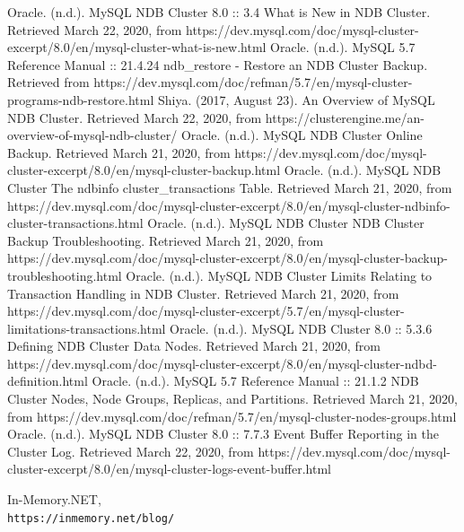\documentclass{acmart}
\begin{document}
\begin{thebibliography}{99}
     Oracle. (n.d.). MySQL NDB Cluster 8.0 :: 3.4 What is New in NDB Cluster. Retrieved March 22, 2020, from https://dev.mysql.com/doc/mysql-cluster-excerpt/8.0/en/mysql-cluster-what-is-new.html
     Oracle. (n.d.). MySQL 5.7 Reference Manual :: 21.4.24 ndb\_restore - Restore an NDB Cluster Backup. Retrieved from https://dev.mysql.com/doc/refman/5.7/en/mysql-cluster-programs-ndb-restore.html
      Shiya. (2017, August 23). An Overview of MySQL NDB Cluster. Retrieved March 22, 2020, from https://clusterengine.me/an-overview-of-mysql-ndb-cluster/ 
	 Oracle. (n.d.). MySQL NDB Cluster Online Backup. Retrieved March 21, 2020, from https://dev.mysql.com/doc/mysql-cluster-excerpt/8.0/en/mysql-cluster-backup.html
	 Oracle. (n.d.). MySQL NDB Cluster The ndbinfo cluster\_transactions Table. Retrieved March 21, 2020, from https://dev.mysql.com/doc/mysql-cluster-excerpt/8.0/en/mysql-cluster-ndbinfo-cluster-transactions.html
	 Oracle. (n.d.). MySQL NDB Cluster NDB Cluster Backup Troubleshooting. Retrieved March 21, 2020, from https://dev.mysql.com/doc/mysql-cluster-excerpt/8.0/en/mysql-cluster-backup-troubleshooting.html
	 Oracle. (n.d.). MySQL NDB Cluster Limits Relating to Transaction Handling in NDB Cluster. Retrieved March 21, 2020, from https://dev.mysql.com/doc/mysql-cluster-excerpt/5.7/en/mysql-cluster-limitations-transactions.html
	 Oracle. (n.d.). MySQL NDB Cluster 8.0 :: 5.3.6 Defining NDB Cluster Data Nodes. Retrieved March 21, 2020, from https://dev.mysql.com/doc/mysql-cluster-excerpt/8.0/en/mysql-cluster-ndbd-definition.html
	 Oracle. (n.d.). MySQL 5.7 Reference Manual :: 21.1.2 NDB Cluster Nodes, Node Groups, Replicas, and Partitions. Retrieved March 21, 2020, from https://dev.mysql.com/doc/refman/5.7/en/mysql-cluster-nodes-groups.html
	 Oracle. (n.d.). MySQL NDB Cluster 8.0 :: 7.7.3 Event Buffer Reporting in the Cluster Log. Retrieved March 22, 2020, from https://dev.mysql.com/doc/mysql-cluster-excerpt/8.0/en/mysql-cluster-logs-event-buffer.html
	
	In-Memory.NET,
    \\\texttt{https://inmemory.net/blog/}
    

\end{thebibliography}
\end{document}
